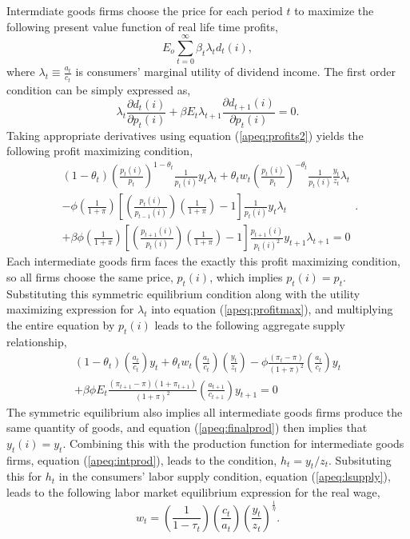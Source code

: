 \documentclass[12pt]{article}
\newcommand{\beq}{\begin{equation}}
\newcommand{\eeq}{\end{equation}}
\newcommand{\ds}{\displaystyle}
\begin{document}
Intermdiate goods firms choose the price for each period $t$ to maximize the following present value function of real life time profits,
\beq E_o \sum_{t=0}^{\infty} \beta_t \lambda_t d_t(i), \eeq
where $\lambda_t \equiv \frac{a_t}{c_t}$ is consumers' marginal utility of dividend income.  The first order condition can be simply expressed as,
\beq \lambda_t \frac{\partial d_t(i)}{\partial p_t(i)} + \beta E_t \lambda_{t+1} \frac{\partial d_{t+1}(i)}{\partial p_t(i)} = 0. \eeq
Taking appropriate derivatives using equation (\ref{apeq:profits2}) yields the following profit maximizing condition,
\beq \label{apeq:profitmax} \begin{array}{l}
\ds (1-\theta_t) \left(\frac{p_t(i)}{p_t}\right)^{1-\theta_t} \frac{1}{p_t(i)} y_t \lambda_t 
+ \theta_t w_t \left(\frac{p_t(i)}{p_t}\right)^{-\theta_t} \frac{1}{p_t(i)} \frac{y_t}{z_t} \lambda_t \\ [1.5pc]
\ds - \phi \left(\frac{1}{1+\pi}\right) \left[ \left(\frac{p_t(i)}{p_{t-1}(i)}\right) \left(\frac{1}{1+\pi}\right) - 1\right] \frac{1}{p_t(i)} y_t \lambda_t \\ [1.5pc]
\ds + \beta \phi \left(\frac{1}{1+\pi}\right) \left[ \left(\frac{p_{t+1}(i)}{p_{t}(i)}\right) \left(\frac{1}{1+\pi}\right) - 1\right] \frac{p_{t+1}(i)}{p_t(i)^2} y_{t+1} \lambda_{t+1} = 0 \end{array}. \eeq
Each intermediate goods firm faces the exactly this profit maximizing condition, so all firms choose the same price, $p_t(i)$, which implies $p_t(i)=p_t$.  Substituting this symmetric equilibrium condition along with the utility maximizing expression for $\lambda_t$ into equation (\ref{apeq:profitmax}), and multiplying the entire equation by $p_t(i)$ leads to the following aggregate supply relationship,
\beq \label{apeq:as} \begin{array}{l} \ds (1-\theta_t) \left(\frac{a_t}{c_t}\right) y_t  + \theta_t w_t \left(\frac{a_t}{c_t}\right) \left( \frac{y_t}{z_t} \right)
- \phi \frac{(\pi_t - \pi)}{(1+\pi)^2}  \left(\frac{a_t}{c_t}\right) y_t \\ [1pc]
\ds +\beta \phi E_t \frac{(\pi_{t+1} - \pi)(1+\pi_{t+1})}{(1+\pi)^2}  \left(\frac{a_{t+1}}{c_{t+1}}\right) y_{t+1} = 0\end{array} \eeq
The symmetric equilibrium also implies all intermediate goods firms produce the same quantity of goods, and equation (\ref{apeq:finalprod}) then implies that $y_t(i) = y_t$.  Combining this with the production function for intermediate goods firms, equation (\ref{apeq:intprod}), leads to the condition, $h_t = y_t/z_t$.  Subsituting this for $h_t$ in the consumers' labor supply condition, equation (\ref{apeq:lsupply}), leads to the following labor market equilibrium expression for the real wage,
\beq \label{apeq:wage} w_t = \left(\frac{1}{1-\tau_t}\right) \left(\frac{c_t}{a_t}\right) \left(\frac{y_t}{z_t}\right)^{\frac{1}{\eta}}. \eeq 
\end{document}
